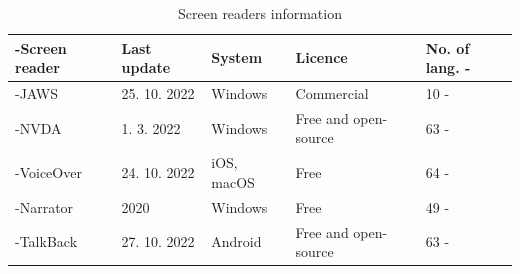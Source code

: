 \begin{table}[tp]
\tablestretch
{}
\centering
\begin{tabularx}{\linewidth}
{>{\kern-\tabcolsep}lllXX<{\kern-\tabcolsep}}
\toprule
\textbf{Screen reader} & \textbf{Last update} & \textbf{System} & \textbf{Licence} & \textbf{No. of lang.} \\
\midrule
JAWS & 25. 10. 2022 & Windows & Commercial & 10 \\
%
NVDA & 1. 3. 2022 & Windows & Free and open-source & 63 \\
%
VoiceOver & 24. 10. 2022 & iOS, macOS & Free & 64 \\
%
Narrator & 2020 & Windows & Free & 49 \\
%
TalkBack & 27. 10. 2022 & Android & Free and open-source & 63 \\
\bottomrule
\end{tabularx}

\caption[Screen Readers Information]
{
Screen readers information
}
\label{tab:screen-readers-info}
\end{table}


